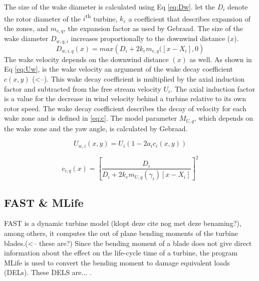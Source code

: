 The size of the wake diameter is calculated using Eq \ref{eq:Dw}. let the $D_i$ denote the rotor diameter of the $i${\textsuperscript{th}} turbine, $k_e$ a coefficient that describes expansion of the zones, and $m_{e,q}$, the expansion factor as used by Gebraad\cite{Gebraad2016}. The size of the wake diameter $D_{w,q,i}$ increases proportionally to the downwind distance ($x$). 
\begin{equation}
\label{eq:Dw}
D_{w,i,q}(x) = max({D_i + 2k_em_{e,q}([x - X_i],0} )
\end{equation}
The wake velocity depends on the downwind distance $(x)$ as well. As shown in Eq \ref{eq:Uw}, is the wake velocity an argument of the wake decay coefficient $c(x,y)$ (<--). This wake decay coefficient is multiplied by the axial induction factor and subtracted from the free stream velocity $U_i$. The axial induction factor is a value for the decrease in wind velocity behind a turbine relative to its own rotor speed. The wake decay coefficient describes the decay of velocity for each wake zone and is defined in \ref{eq:c}. The model parameter $M_{U,q}$, which depends on the wake zone and the yaw angle, is calculated by Gebraad.\cite{Gebraad2016}   

\begin{equation}
\label{eq:Uw}
U_{w,i}(x,y) = U_i\left( {1-2a_ic_i(x,y)} \right)
\end{equation} 

\begin{equation}
\label{eq:c}
c_{i,q}(x) = \left[ \frac{D_i}{D_i + 2k_em_{U,q}(\gamma_i)[x - X_i]} \right]^2
\end{equation}




\subsection{FAST \& MLife} FAST is a dynamic turbine model\cite{Jonkman2005} (klopt deze cite nog met deze benaming?), among others, it computes the out of plane bending moments of the turbine blades.(<-- these are?) Since the bending moment of a blade does not give direct information about the effect on the life-cycle time of a turbine, the program MLife is used to convert the bending moment to damage equivalent loads (DELs). These DELS are... \cite{Mlife}.


